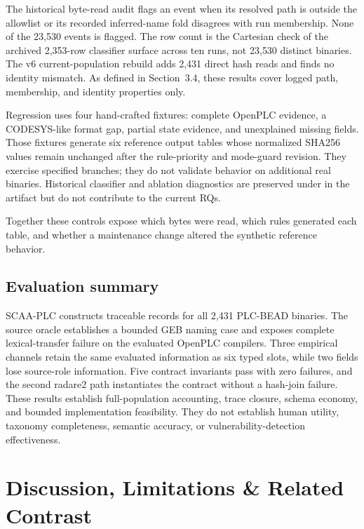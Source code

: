 \documentclass[manuscript,screen,review]{acmart}
\begin{document}
The historical byte-read audit flags an event when its resolved path is outside the allowlist or its recorded inferred-name fold disagrees with run membership. None of the 23{,}530 events is flagged. The row count is the Cartesian check of the archived 2{,}353-row classifier surface across ten runs, not 23{,}530 distinct binaries. The v6 current-population rebuild adds 2{,}431 direct hash reads and finds no identity mismatch. As defined in Section~3.4, these results cover logged path, membership, and identity properties only.

Regression uses four hand-crafted fixtures: complete OpenPLC evidence, a CODESYS-like format gap, partial state evidence, and unexplained missing fields. Those fixtures generate six reference output tables whose normalized SHA256 values remain unchanged after the rule-priority and mode-guard revision. They exercise specified branches; they do not validate behavior on additional real binaries. Historical classifier and ablation diagnostics are preserved under  in the artifact but do not contribute to the current RQs.

Together these controls expose which bytes were read, which rules generated each table, and whether a maintenance change altered the synthetic reference behavior.

\subsection{Evaluation summary}

SCAA-PLC constructs traceable records for all 2{,}431 PLC-BEAD binaries. The source oracle establishes a bounded GEB naming case and exposes complete lexical-transfer failure on the evaluated OpenPLC compilers. Three empirical channels retain the same evaluated information as six typed slots, while two fields lose source-role information. Five contract invariants pass with zero failures, and the second radare2 path instantiates the contract without a hash-join failure. These results establish full-population accounting, trace closure, schema economy, and bounded implementation feasibility. They do not establish human utility, taxonomy completeness, semantic accuracy, or vulnerability-detection effectiveness.



\section{Discussion, Limitations \& Related Contrast}
\end{document}
